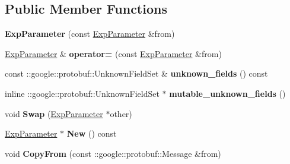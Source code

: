 \subsection*{Public Member Functions}
\begin{DoxyCompactItemize}
\item 
\mbox{\label{classcaffe_1_1_exp_parameter_a06bb7c6918ddf9855475155ea486a3a1}} 
{\bfseries Exp\+Parameter} (const \mbox{\hyperlink{classcaffe_1_1_exp_parameter}{Exp\+Parameter}} \&from)
\item 
\mbox{\label{classcaffe_1_1_exp_parameter_a8020a22dbac661ffc67dc8a6a07927e7}} 
\mbox{\hyperlink{classcaffe_1_1_exp_parameter}{Exp\+Parameter}} \& {\bfseries operator=} (const \mbox{\hyperlink{classcaffe_1_1_exp_parameter}{Exp\+Parameter}} \&from)
\item 
\mbox{\label{classcaffe_1_1_exp_parameter_ad483b059bf3df573a7308fe042aed578}} 
const \+::google\+::protobuf\+::\+Unknown\+Field\+Set \& {\bfseries unknown\+\_\+fields} () const
\item 
\mbox{\label{classcaffe_1_1_exp_parameter_a8a35de82bc1acaff28500ae141f78513}} 
inline \+::google\+::protobuf\+::\+Unknown\+Field\+Set $\ast$ {\bfseries mutable\+\_\+unknown\+\_\+fields} ()
\item 
\mbox{\label{classcaffe_1_1_exp_parameter_a3b823c40695afd4c43ccc427a9eb72ce}} 
void {\bfseries Swap} (\mbox{\hyperlink{classcaffe_1_1_exp_parameter}{Exp\+Parameter}} $\ast$other)
\item 
\mbox{\label{classcaffe_1_1_exp_parameter_afa7b2fc49c439b9a6751cde874c9fd3e}} 
\mbox{\hyperlink{classcaffe_1_1_exp_parameter}{Exp\+Parameter}} $\ast$ {\bfseries New} () const
\item 
\mbox{\label{classcaffe_1_1_exp_parameter_afdcdce8a3fc5cf5543464bed0e55a01e}} 
void {\bfseries Copy\+From} (const \+::google\+::protobuf\+::\+Message \&from)
\item 
\mbox{\label{classcaffe_1_1_exp_parameter_abcf28d4f09a72f79611e62bcff88b599}} 

\end{DoxyCompactItemize}
